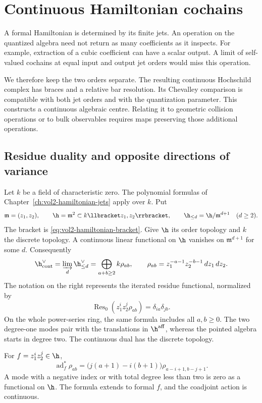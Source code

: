\chapter{Continuous Hamiltonian cochains}
\label{ch:vol2-continuous-cochains}

A formal Hamiltonian is determined by its finite jets. An operation on
the quantized algebra need not return as many coefficients as it inspects.
For example, extraction of a cubic coefficient can have a scalar
output. A limit of self-valued cochains at equal input and output
jet orders would miss this operation.

We therefore keep the two orders separate. The resulting continuous
Hochschild complex has braces and a relative bar resolution. Its
Chevalley comparison is compatible with both jet orders and with
the quantization parameter. This constructs a continuous algebraic
centre. Relating it to geometric collision operations or to bulk
observables requires maps preserving those additional operations.

\section{Residue duality and opposite directions of variance}

Let $k$ be a field of characteristic zero. The polynomial formulas of
Chapter~\ref{ch:vol2-hamiltonian-jets} apply over $k$. Put
\[
 \mathfrak m=(z_1,z_2),\qquad
 \h=\mathfrak m^2\subset k\llbracket z_1,z_2\rrbracket,
 \qquad \h_{\leq d}=\h/\mathfrak m^{d+1}\quad(d\geq2).
\]
The bracket is \eqref{eq:vol2-hamiltonian-bracket}. Give $\h$ its
order topology and $k$ the discrete topology. A continuous linear
functional on $\h$ vanishes on $\mathfrak m^{d+1}$ for some $d$.
Consequently
\begin{equation}\label{eq:vol2-continuous-dual}
 \h^\vee_{\mathrm{cont}}
   =\varinjlim_d\h_{\leq d}^\vee
   =\bigoplus_{a+b\geq2}k\rho_{ab},
 \qquad
 \rho_{ab}=z_1^{-a-1}z_2^{-b-1}\,dz_1\,dz_2.
\end{equation}
The notation on the right represents the iterated residue functional,
normalized by
\[
 \operatorname{Res}_0(z_1^iz_2^j\rho_{ab})=\delta_{ia}\delta_{jb}.
\]
On the whole power-series ring, the same formula includes all
$a,b\geq0$. The two degree-one modes pair with the translations in
$\h^{\mathrm{aff}}$, whereas the pointed algebra starts in degree two.
The continuous dual has the discrete topology.

\begin{proposition}\label{prop:vol2-continuous-coadjoint}
For $f=z_1^iz_2^j\in\h$,
\begin{equation}\label{eq:vol2-residue-coadjoint}
 \operatorname{ad}_f^*\rho_{ab}
  =\bigl(j(a+1)-i(b+1)\bigr)\rho_{a-i+1,b-j+1}.
\end{equation}
A mode with a negative index or with total degree less than two is
zero as a functional on $\h$. The formula extends to formal $f$,
and the coadjoint action is continuous.
\end{proposition}

